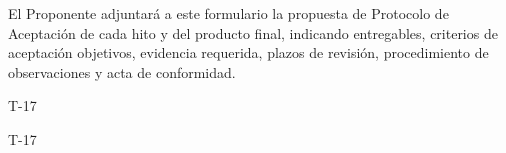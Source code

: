 
  {El Proponente adjuntará a este formulario la propuesta de Protocolo de Aceptación de cada hito y del producto final, indicando entregables, criterios de aceptación objetivos, evidencia requerida, plazos de revisión, procedimiento de observaciones y acta de conformidad.}

\expandafter\def\csname esqueleto@T-17\endcsname{%
  \begin{formulario}{T-17}
    \begin{contenidoExigido}{T-17}
    \end{contenidoExigido}
  \end{formulario}}
